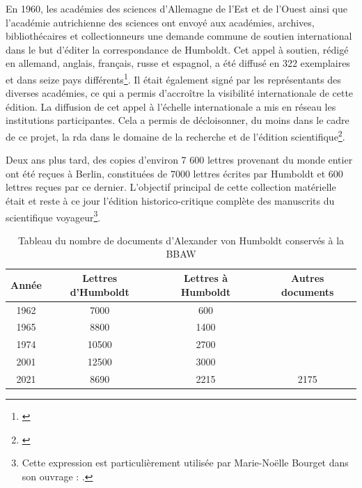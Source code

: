 \documentclass[a4paper, 12pt, twoside]{book}
\begin{document}
En 1960, les académies des sciences d'Allemagne de l'Est et de l'Ouest ainsi que l'académie autrichienne des sciences ont envoyé aux académies, archives, bibliothécaires et collectionneurs une demande commune de soutien international dans le but d'éditer la correspondance de Humboldt. Cet appel à soutien, rédigé en allemand, anglais, français, russe et espagnol, a été diffusé en 322 exemplaires et dans seize pays différents\footnote{\cite[p.56]{schuchardt_fakt_2010}}. Il était également signé par les représentants des diverses académies, ce qui a permis d'accroître la visibilité internationale de cette édition. La diffusion de cet appel à l'échelle internationale a mis en réseau les institutions participantes. Cela a permis de décloisonner, du moins dans le cadre de ce projet, la \gls{rda} dans le domaine de la recherche et de l'édition scientifique\footnote{\cite[p.57]{schuchardt_fakt_2010}}.

Deux ans plus tard, des copies d'environ 7 600 lettres provenant du monde entier ont été reçues à Berlin, constituées de 7000 lettres écrites par Humboldt et 600 lettres reçues par ce dernier. L'objectif principal de cette collection matérielle était et reste à ce jour l'édition historico-critique complète des manuscrits du scientifique voyageur\footnote{Cette expression est particulièrement utilisée par Marie-Noëlle Bourget dans son ouvrage : \cite{bourguet_monde_2017}.}. 

\begin{table}[!h]
\centering
\renewcommand*{\footnoterule}{}
\begin{tabular}{|c|c|c|c|}
\hline
Année\footnotemark & Lettres d'Humboldt & Lettres à Humboldt & Autres documents \\ \hline
1962 & 7000 & 600 & \\
1965 & 8800 & 1400 & \\
1974 & 10500 & 2700 & \\
2001 & 12500 & 3000 & \\
2021 & 8690 & 2215 & 2175 \\\hline
\end{tabular}
\caption{Tableau du nombre de documents d'Alexander von Humboldt conservés à la BBAW}
\label{tab:tableauxDocsConservés}
\end{table}
\end{document}
